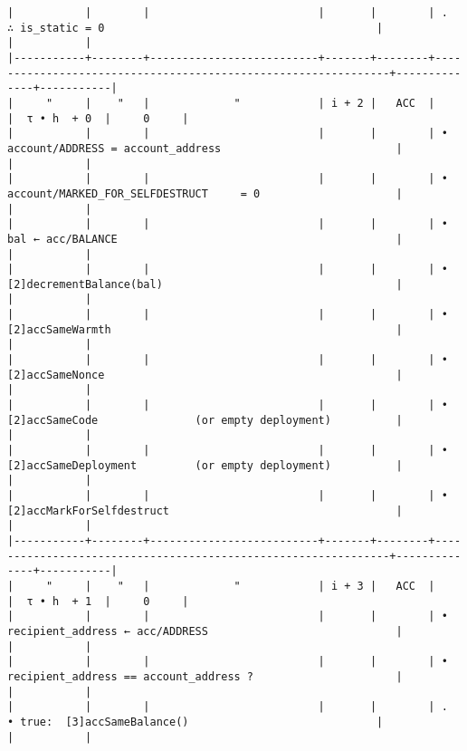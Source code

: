 \documentclass[varwidth=\maxdimen,margin=0.5cm,multi={verbatim}]{standalone}
\begin{document}
\begin{verbatim}
|           |        |                          |       |        | .    ∴ is_static = 0                                          |              |           |
|-----------+--------+--------------------------+-------+--------+---------------------------------------------------------------+--------------+-----------|
|     "     |    "   |             "            | i + 2 |   ACC  |                                                               |  τ • h  + 0  |     0     |
|           |        |                          |       |        | • account/ADDRESS = account_address                           |              |           |
|           |        |                          |       |        | • account/MARKED_FOR_SELFDESTRUCT     = 0                     |              |           |
|           |        |                          |       |        | • bal ← acc/BALANCE                                           |              |           |
|           |        |                          |       |        | • [2]decrementBalance(bal)                                    |              |           |
|           |        |                          |       |        | • [2]accSameWarmth                                            |              |           |
|           |        |                          |       |        | • [2]accSameNonce                                             |              |           |
|           |        |                          |       |        | • [2]accSameCode               (or empty deployment)          |              |           |
|           |        |                          |       |        | • [2]accSameDeployment         (or empty deployment)          |              |           |
|           |        |                          |       |        | • [2]accMarkForSelfdestruct                                   |              |           |
|-----------+--------+--------------------------+-------+--------+---------------------------------------------------------------+--------------+-----------|
|     "     |    "   |             "            | i + 3 |   ACC  |                                                               |  τ • h  + 1  |     0     |
|           |        |                          |       |        | • recipient_address ← acc/ADDRESS                             |              |           |
|           |        |                          |       |        | • recipient_address == account_address ?                      |              |           |
|           |        |                          |       |        | .    • true:  [3]accSameBalance()                             |              |           |

\end{verbatim}
\end{document}
